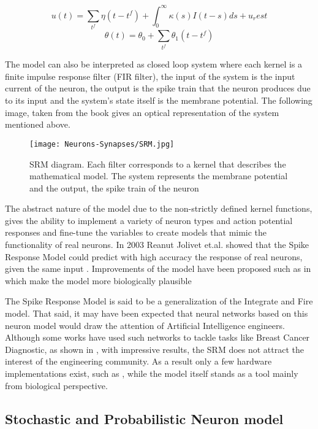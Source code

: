 \documentclass[12pt]{report}
\begin{document}
\begin{equation}
u(t) = \sum_{t^f}\eta(t-t^f)+\int_0^\infty\kappa(s)I(t-s)ds+u_rest
\end{equation}
\begin{equation}
\theta(t) = \theta_0 + \sum_{t^f}\theta_1(t-t^f)
\end{equation}

The model can also be interpreted as closed loop system where each kernel is a finite impulse response filter (FIR filter), the input of the system is the input current of the neuron, the output is the spike train that the neuron produces due to its input and the system's state itself is the membrane potential. The following image, taken from the book \cite{gerstner2014} gives an optical representation of the system mentioned above.

\begin{figure}[htp]
    \centering
    \texttt{[image: Neurons-Synapses/SRM.jpg]}
    \caption{SRM diagram. Each filter corresponds to a kernel that describes the mathematical model. The system represents the membrane potential and the output, the spike train of the neuron}
    \label{fig:lif-neuron}
\end{figure}

The abstract nature of the model due to the non-strictly defined kernel functions, gives the ability to implement a variety of neuron types and action potential responses and fine-tune the variables to create models that mimic the functionality of real neurons. In 2003 Reanut Jolivet et.al. showed that the Spike Response Model could predict with high accuracy the response of real neurons, given the same input \cite{Jolivet2003}. Improvements of the model have been proposed such as in \cite{Bohte2012} which make the model more biologically plausible

The Spike Response Model is said to be a generalization of the Integrate and Fire model. That said, it may have been expected that 
neural networks based on this neuron model would draw the attention of Artificial Intelligence engineers. Although some works have used such networks to tackle tasks like Breast Cancer Diagnostic, as shown in \cite{Ourdighi2016}, with impressive results, the SRM does not attract the interest of the engineering community. As a result only a few hardware implementations exist, such as \cite{Clayton2011}, while the model itself stands as a tool mainly from biological perspective.

\subsection{Stochastic and Probabilistic Neuron model}
\end{document}
